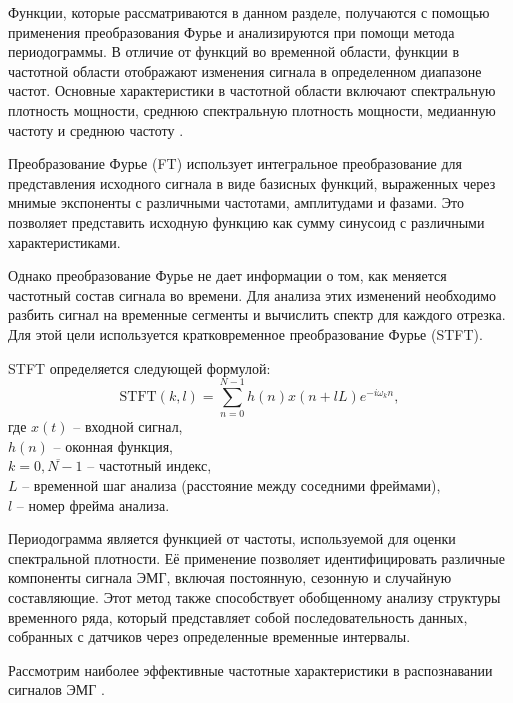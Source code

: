 Функции, которые рассматриваются в данном разделе, получаются с помощью применения преобразования Фурье и анализируются при помощи метода периодограммы. В отличие от функций во временной области, функции в частотной области отображают изменения сигнала в определенном диапазоне частот. Основные характеристики в частотной области включают спектральную плотность мощности, среднюю спектральную плотность мощности, медианную частоту и среднюю частоту \cite{bib:feature:1}.

Преобразование Фурье (FT) использует интегральное преобразование для представления исходного сигнала в виде базисных функций, выраженных через мнимые экспоненты с различными частотами, амплитудами и фазами. Это позволяет представить исходную функцию как сумму синусоид с различными характеристиками.

Однако преобразование Фурье не дает информации о том, как меняется частотный состав сигнала во времени. Для анализа этих изменений необходимо разбить сигнал на временные сегменты и вычислить спектр для каждого отрезка. Для этой цели используется кратковременное преобразование Фурье (STFT).

STFT определяется следующей формулой:
\begin{equation}
    \text{STFT}(k,l) = \sum\limits_{n=0}^{N-1}h(n)x(n+lL)e^{-i\omega_k n},
\end{equation}
где $x(t)$ -- входной сигнал,\\ \phantom{где} $h(n)$ -- оконная функция,\\ \phantom{где} $k=\overline{0,N-1}$ -- частотный индекс,\\ \phantom{где} $L$ -- временной шаг анализа (расстояние между соседними фреймами),\\ \phantom{где} $l$ -- номер фрейма анализа.

Периодограмма является функцией от частоты, используемой для оценки спектральной плотности. Её применение позволяет идентифицировать различные компоненты сигнала ЭМГ, включая постоянную, сезонную и случайную составляющие. Этот метод также способствует обобщенному анализу структуры временного ряда, который представляет собой последовательность данных, собранных с датчиков через определенные временные интервалы.

Рассмотрим наиболее эффективные частотные характеристики в распознавании сигналов ЭМГ \cite{bib:feature:2}.

